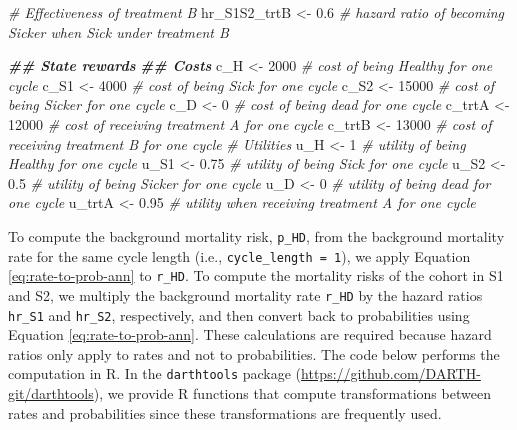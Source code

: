 \documentclass[
]{article}
\newenvironment{Shaded}{\begin{snugshade}}{\end{snugshade}}
\newcommand{\CommentTok}[1]{\textcolor[rgb]{0.56,0.35,0.01}{\textit{#1}}}
\newcommand{\DecValTok}[1]{\textcolor[rgb]{0.00,0.00,0.81}{#1}}
\newcommand{\DocumentationTok}[1]{\textcolor[rgb]{0.56,0.35,0.01}{\textbf{\textit{#1}}}}
\newcommand{\FloatTok}[1]{\textcolor[rgb]{0.00,0.00,0.81}{#1}}
\newcommand{\NormalTok}[1]{#1}
\newcommand{\OtherTok}[1]{\textcolor[rgb]{0.56,0.35,0.01}{#1}}
\begin{document}
\begin{Shaded}
\begin{Highlighting}[]
\CommentTok{\# Effectiveness of treatment B}
\NormalTok{hr\_S1S2\_trtB }\OtherTok{\textless{}{-}} \FloatTok{0.6} \CommentTok{\# hazard ratio of becoming Sicker when Sick under treatment B}

\DocumentationTok{\#\# State rewards}
\DocumentationTok{\#\# Costs}
\NormalTok{c\_H    }\OtherTok{\textless{}{-}} \DecValTok{2000}  \CommentTok{\# cost of being Healthy for one cycle }
\NormalTok{c\_S1   }\OtherTok{\textless{}{-}} \DecValTok{4000}  \CommentTok{\# cost of being Sick for one cycle }
\NormalTok{c\_S2   }\OtherTok{\textless{}{-}} \DecValTok{15000} \CommentTok{\# cost of being Sicker for one cycle}
\NormalTok{c\_D    }\OtherTok{\textless{}{-}} \DecValTok{0}     \CommentTok{\# cost of being dead for one cycle}
\NormalTok{c\_trtA }\OtherTok{\textless{}{-}} \DecValTok{12000} \CommentTok{\# cost of receiving treatment A for one cycle}
\NormalTok{c\_trtB }\OtherTok{\textless{}{-}} \DecValTok{13000} \CommentTok{\# cost of receiving treatment B for one cycle }
\CommentTok{\# Utilities}
\NormalTok{u\_H    }\OtherTok{\textless{}{-}} \DecValTok{1}     \CommentTok{\# utility of being Healthy for one cycle }
\NormalTok{u\_S1   }\OtherTok{\textless{}{-}} \FloatTok{0.75}  \CommentTok{\# utility of being Sick for one cycle }
\NormalTok{u\_S2   }\OtherTok{\textless{}{-}} \FloatTok{0.5}   \CommentTok{\# utility of being Sicker for one cycle}
\NormalTok{u\_D    }\OtherTok{\textless{}{-}} \DecValTok{0}     \CommentTok{\# utility of being dead for one cycle}
\NormalTok{u\_trtA }\OtherTok{\textless{}{-}} \FloatTok{0.95}  \CommentTok{\# utility when receiving treatment A for one cycle}
\end{Highlighting}
\end{Shaded}

To compute the background mortality risk, \texttt{p\_HD}, from the background mortality rate for the same cycle length (i.e., \texttt{cycle\_length\ =\ 1}), we apply Equation \eqref{eq:rate-to-prob-ann} to \texttt{r\_HD}. To compute the mortality risks of the cohort in S1 and S2, we multiply the background mortality rate \texttt{r\_HD} by the hazard ratios \texttt{hr\_S1} and \texttt{hr\_S2}, respectively, and then convert back to probabilities using Equation \eqref{eq:rate-to-prob-ann}. These calculations are required because hazard ratios only apply to rates and not to probabilities. The code below performs the computation in R. In the \texttt{darthtools} package (\url{https://github.com/DARTH-git/darthtools}), we provide R functions that compute transformations between rates and probabilities since these transformations are frequently used.
\end{document}
